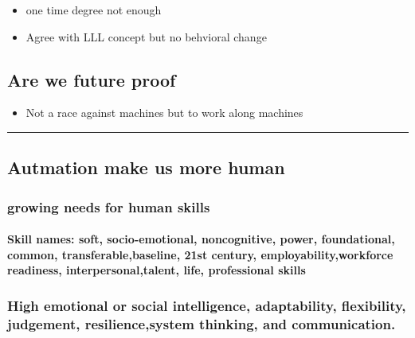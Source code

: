 \documentclass[]{tufte-handout}
\providecommand{\tightlist}{%
  \setlength{\itemsep}{0pt}\setlength{\parskip}{0pt}}
\begin{document}
\begin{itemize}
\tightlist
\item
  one time degree not enough
\item
  Agree with LLL concept but no behvioral change
\end{itemize}

\hypertarget{are-we-future-proof}{%
\subsection{Are we future proof}\label{are-we-future-proof}}

\begin{itemize}
\tightlist
\item
  Not a race against machines but to work along machines
\end{itemize}

\begin{center}\rule{0.5\linewidth}{0.5pt}\end{center}

\hypertarget{autmation-make-us-more-human}{%
\subsection{Autmation make us more
human}\label{autmation-make-us-more-human}}

\hypertarget{growing-needs-for-human-skills}{%
\subsubsection{growing needs for human
skills}\label{growing-needs-for-human-skills}}

\hypertarget{skill-names-soft-socio-emotional-noncognitive-power-foundational-common-transferablebaseline-21st-century-employabilityworkforce-readiness-interpersonaltalent-life-professional-skills}{%
\paragraph{Skill names: soft, socio-emotional, noncognitive, power,
foundational, common, transferable,baseline, 21st century,
employability,workforce readiness, interpersonal,talent, life,
professional
skills}\label{skill-names-soft-socio-emotional-noncognitive-power-foundational-common-transferablebaseline-21st-century-employabilityworkforce-readiness-interpersonaltalent-life-professional-skills}}

\hypertarget{high-emotional-or-social-intelligence-adaptability-flexibility-judgement-resiliencesystem-thinking-and-communication.}{%
\subsubsection{High emotional or social intelligence, adaptability,
flexibility, judgement, resilience,system thinking, and
communication.}\label{high-emotional-or-social-intelligence-adaptability-flexibility-judgement-resiliencesystem-thinking-and-communication.}}
\end{document}

